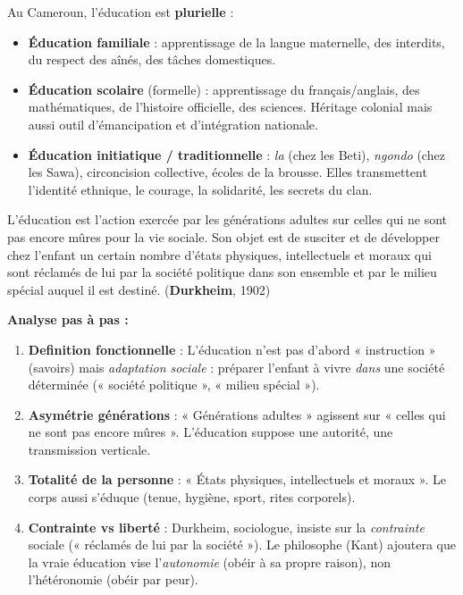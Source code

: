 \documentclass[11pt]{article}
\begin{document}
Au Cameroun, l'éducation est \textbf{plurielle} :
\begin{itemize}
    \item \textbf{Éducation familiale} : apprentissage de la langue maternelle, des interdits, du respect des aînés, des tâches domestiques.
    \item \textbf{Éducation scolaire} (formelle) : apprentissage du français/anglais, des mathématiques, de l'histoire officielle, des sciences. Héritage colonial mais aussi outil d'émancipation et d'intégration nationale.
    \item \textbf{Éducation initiatique / traditionnelle} : \emph{la} (chez les Beti), \emph{ngondo} (chez les Sawa), circoncision collective, écoles de la brousse. Elles transmettent l'identité ethnique, le courage, la solidarité, les secrets du clan.
\end{itemize}

\begin{experience}
\guillemotleft L'éducation est l'action exercée par les générations adultes sur celles qui ne sont pas encore mûres pour la vie sociale. Son objet est de susciter et de développer chez l'enfant un certain nombre d'états physiques, intellectuels et moraux qui sont réclamés de lui par la société politique dans son ensemble et par le milieu spécial auquel il est destiné. \guillemotright (\textbf{Durkheim}, 1902)

\textbf{Analyse pas à pas :}
\begin{enumerate}
    \item \textbf{Definition fonctionnelle} : L'éducation n'est pas d'abord « instruction » (savoirs) mais \emph{adaptation sociale} : préparer l'enfant à vivre \emph{dans} une société déterminée (« société politique », « milieu spécial »).
    \item \textbf{Asymétrie générations} : « Générations adultes » agissent sur « celles qui ne sont pas encore mûres ». L'éducation suppose une autorité, une transmission verticale.
    \item \textbf{Totalité de la personne} : « États physiques, intellectuels et moraux ». Le corps aussi s'éduque (tenue, hygiène, sport, rites corporels).
    \item \textbf{Contrainte vs liberté} : Durkheim, sociologue, insiste sur la \emph{contrainte} sociale (« réclamés de lui par la société »). Le philosophe (Kant) ajoutera que la vraie éducation vise l'\emph{autonomie} (obéir à sa propre raison), non l'hétéronomie (obéir par peur).
\end{enumerate}
\end{experience}
\end{document}
